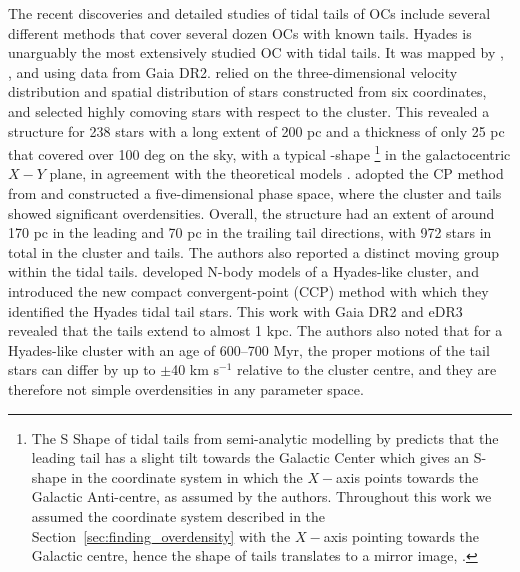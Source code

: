 \documentclass{aa}
\begin{document}
The recent discoveries and detailed studies of tidal tails of OCs include several different methods that cover several dozen OCs with known tails. Hyades is unarguably the most extensively studied OC with tidal tails. It was mapped by \citet{2019A&A...621L...3Meingast}, \citet{2019A&A...621L...2Roser_Hyades}, and \citet{2021A&A...647A.137Jerabkova} using data from Gaia DR2. \citet{2019A&A...621L...3Meingast} relied on the three-dimensional velocity distribution and spatial distribution of stars constructed from six coordinates, and selected highly comoving stars with respect to the cluster. This revealed a structure for 238 stars with a long extent of 200 pc and a thickness of only 25 pc that covered over 100 deg on the sky, with a typical -shape
\footnote{The S Shape of tidal tails from semi-analytic modelling by \citet{2020A&A...640A..84Dinnbier} predicts that the leading tail has a slight tilt towards the Galactic Center which gives an S-shape in the coordinate system in which the $X-$axis points towards the Galactic Anti-centre, as assumed by the authors. Throughout this work we assumed the coordinate system described in the Section~\ref{sec:finding_overdensity} with the $X-$axis pointing towards the Galactic centre, hence the shape of tails translates to a mirror image, .} 
in the galactocentric $X-Y$ plane, in agreement with the theoretical models \citep{2020A&A...640A..84Dinnbier, 2020MNRAS.497..536Wang}. \citet{2019A&A...621L...2Roser_Hyades} adopted the CP method from \citet{2009A&A...497..209V} and constructed a five-dimensional phase space, where the cluster and tails showed significant overdensities.  Overall, the structure had an extent of around 170 pc in the leading and 70 pc in the trailing tail directions, with 972 stars in total in the cluster and tails. The authors also reported a distinct moving group within the tidal tails. \citet{2021A&A...647A.137Jerabkova} developed N-body models of a Hyades-like cluster, and introduced the new compact convergent-point (CCP) method with which they identified the Hyades tidal tail stars. This work with Gaia DR2 and eDR3 revealed that the tails extend to almost 1 kpc. The authors also noted that for a Hyades-like cluster with an age of 600--700 Myr, the proper motions of the tail stars can differ by up to $\pm$40 km s$^{-1}$ relative to the cluster centre, and they are therefore not simple overdensities in any parameter space.
\end{document}
